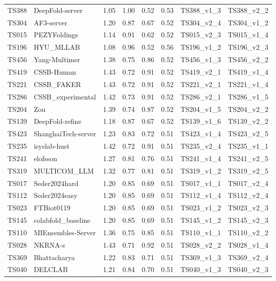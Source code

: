 \begin{longtable}{llllllll}
TS388 & DeepFold-server & 1.05 & 1.00 & 0.52 & 0.53 & TS388\_v1\_3 & TS388\_v2\_2 \\ 
TS304 & AF3-server & 1.20 & 0.87 & 0.67 & 0.52 & TS304\_v2\_4 & TS304\_v1\_2 \\ 
TS015 & PEZYFoldings & 1.14 & 0.91 & 0.62 & 0.52 & TS015\_v2\_3 & TS015\_v1\_4 \\ 
TS196 & HYU\_MLLAB & 1.08 & 0.96 & 0.52 & 0.56 & TS196\_v1\_2 & TS196\_v2\_3 \\ 
TS456 & Yang-Multimer & 1.38 & 0.75 & 0.86 & 0.52 & TS456\_v1\_3 & TS456\_v2\_2 \\ 
TS419 & CSSB-Human & 1.43 & 0.72 & 0.91 & 0.52 & TS419\_v2\_1 & TS419\_v1\_4 \\ 
TS221 & CSSB\_FAKER & 1.43 & 0.72 & 0.91 & 0.52 & TS221\_v2\_1 & TS221\_v1\_4 \\ 
TS286 & CSSB\_experimental & 1.42 & 0.73 & 0.91 & 0.52 & TS286\_v2\_1 & TS286\_v1\_5 \\ 
TS204 & Zou & 1.39 & 0.74 & 0.87 & 0.52 & TS204\_v1\_5 & TS204\_v2\_2 \\ 
TS139 & DeepFold-refine & 1.18 & 0.87 & 0.67 & 0.52 & TS139\_v1\_6 & TS139\_v2\_2 \\ 
TS423 & ShanghaiTech-server & 1.23 & 0.83 & 0.72 & 0.51 & TS423\_v1\_4 & TS423\_v2\_5 \\ 
TS235 & isyslab-hust & 1.42 & 0.72 & 0.91 & 0.51 & TS235\_v2\_4 & TS235\_v1\_1 \\ 
TS241 & elofsson & 1.27 & 0.81 & 0.76 & 0.51 & TS241\_v1\_4 & TS241\_v2\_5 \\ 
TS319 & MULTICOM\_LLM & 1.32 & 0.77 & 0.81 & 0.51 & TS319\_v1\_2 & TS319\_v2\_5 \\ 
TS017 & Seder2024hard & 1.20 & 0.85 & 0.69 & 0.51 & TS017\_v1\_1 & TS017\_v2\_4 \\ 
TS112 & Seder2024easy & 1.20 & 0.85 & 0.69 & 0.51 & TS112\_v1\_4 & TS112\_v2\_4 \\ 
TS023 & FTBiot0119 & 1.20 & 0.85 & 0.69 & 0.51 & TS023\_v1\_2 & TS023\_v2\_3 \\ 
TS145 & colabfold\_baseline & 1.20 & 0.85 & 0.69 & 0.51 & TS145\_v1\_2 & TS145\_v2\_3 \\ 
TS110 & MIEnsembles-Server & 1.36 & 0.75 & 0.85 & 0.51 & TS110\_v1\_1 & TS110\_v2\_2 \\ 
TS028 & NKRNA-s & 1.43 & 0.71 & 0.92 & 0.51 & TS028\_v2\_2 & TS028\_v1\_4 \\ 
TS369 & Bhattacharya & 1.22 & 0.83 & 0.71 & 0.51 & TS369\_v1\_3 & TS369\_v2\_4 \\ 
TS040 & DELCLAB & 1.21 & 0.84 & 0.70 & 0.51 & TS040\_v1\_3 & TS040\_v2\_3 \\ 

\end{longtable}
